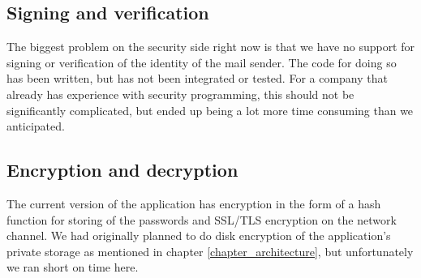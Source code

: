 \subsection{Signing and verification}
The biggest problem on the security side right now is that we have no support for signing or verification of the identity of the mail sender. The code for doing so has been written, but has not been integrated or tested. For a company that already has experience with security programming, this should not be significantly complicated, but ended up being a lot more time consuming than we anticipated.

\subsection{Encryption and decryption}
The current version of the application has encryption in the form of a hash function for storing of the passwords and SSL/TLS encryption on the network channel. We had originally planned to do disk encryption of the application's private storage as mentioned in chapter \ref{chapter_architecture}, but unfortunately we ran short on time here. 
